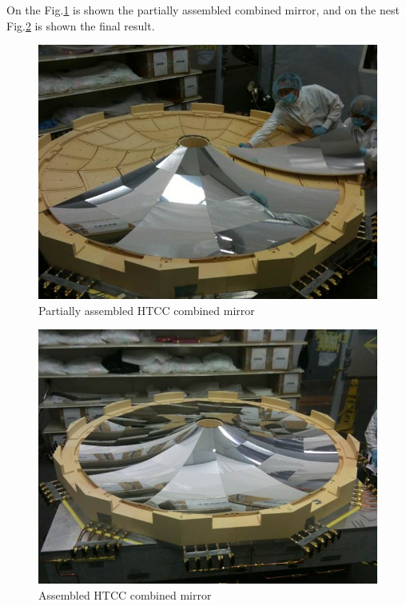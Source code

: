  On the Fig.\ref{fig:Partial_Assembl_MIR} is shown the partially assembled combined mirror, and on the nest Fig.\ref{fig:Compl_Assembl_MIR} is shown the final result. 
 
\begin{figure}[ht]
    \centering
    \includegraphics[width=1.0\linewidth]{images/Partial_Assembl_MIR.jpg}
    \caption{ Partially assembled HTCC combined mirror}
    \label{fig:Partial_Assembl_MIR}
\end{figure}

 \begin{figure}[ht]
    \centering
    \includegraphics[width=1.0\linewidth]{images/Compl_Assembl_MIR.jpg}
    \caption{Assembled HTCC combined mirror}
    \label{fig:Compl_Assembl_MIR}
\end{figure}

